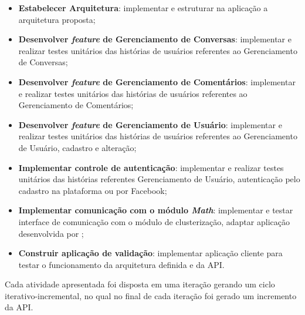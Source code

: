     \begin{itemize}
     \item \textbf{Estabelecer Arquitetura}: implementar e estruturar na aplicação
     a arquitetura proposta;
     \item \textbf{Desenvolver \textit{feature} de Gerenciamento de Conversas}: 
     implementar e realizar testes unitários das histórias de usuários referentes
     ao Gerenciamento de Conversas;
     \item \textbf{Desenvolver \textit{feature} de Gerenciamento de Comentários}: 
     implementar e realizar testes unitários das histórias de usuários referentes
     ao Gerenciamento de Comentários;
     \item \textbf{Desenvolver \textit{feature} de Gerenciamento de Usuário}: 
     implementar e realizar testes unitários das histórias de usuários referentes
     ao Gerenciamento de Usuário, cadastro e alteração;
     \item \textbf{Implementar controle de autenticação}: 
     implementar e realizar testes unitários das histórias referentes Gerenciamento de Usuário, 
     autenticação pelo cadastro na plataforma ou por Facebook;
     \item \textbf{Implementar comunicação com o módulo \textit{Math}}: 
     implementar e testar interface de comunicação com o módulo de clusterização,
     adaptar aplicação desenvolvida por ;
     \item \textbf{Construir aplicação de validação}: 
     implementar aplicação cliente para testar o funcionamento da arquitetura definida e 
     da API.
    \end{itemize}

    Cada atividade apresentada foi disposta em uma iteração gerando um ciclo
    iterativo-incremental, no qual no final de cada iteração foi gerado
    um incremento da API.
    
  
    
    